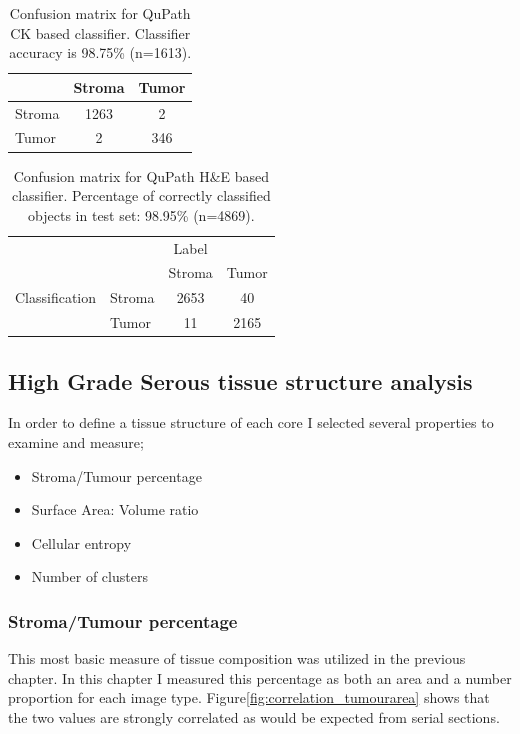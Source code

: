 \begin{table}[]
    \centering
    \begin{tabular}{l|cc}
       &   Stroma  &   Tumor\\
       \hline
Stroma   &    1263    &     2\\
Tumor   &      2     &  346 \\
         
    \end{tabular}
    \caption[Confusion matrix for QuPath CK based classifier.]{Confusion matrix for QuPath CK based classifier. Classifier accuracy is 98.75\% (n=1613).}
    \label{tab:classifier_ck}
\end{table}


\begin{table}[]
    \centering
    \begin{tabular}{llcc}
    \hline
       &           &  Label &\\
       &           &    Stroma	& Tumor\\ 
\hline
Classification & Stroma	&  2653	 &   40\\
             & Tumor	 &   11	 & 2165\\
 \hline
    \end{tabular}
    \caption[Confusion matrix for QuPath H\&E based classifier.]{Confusion matrix for QuPath H\&E based classifier. Percentage of correctly classified objects in test set: 98.95\% (n=4869).}
    \label{tab:classifier_he}
\end{table}


\subsection{High Grade Serous tissue structure analysis}

In order to define a tissue structure of each core I selected several properties to examine and measure;

\begin{itemize}
    \item Stroma/Tumour percentage
    \item Surface Area: Volume ratio
    \item Cellular entropy
    \item Number of clusters 
\end{itemize}

\subsubsection*{Stroma/Tumour percentage}
This most basic measure of tissue composition was utilized in the previous chapter. In this chapter I measured this percentage as both an area and a number proportion for each image type. Figure\ref{fig:correlation_tumourarea} shows that the two values are strongly correlated as would be expected from serial sections. 

